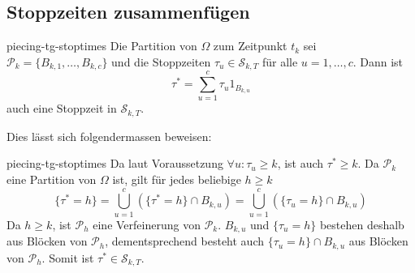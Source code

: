 \documentclass[11pt]{report} %
\begin{document}
\subsection{Stoppzeiten zusammenfügen}
\begin{Theorem}{}{piecing-tg-stoptimes}
    Die Partition von $\Omega$ zum Zeitpunkt $t_k$ sei $\mathcal{P}_k=\{B_{k, 1}, \ldots, B_{k, c}\}$ und die Stoppzeiten $\tau_u\in\mathcal{S}_{k, T}$ für alle $u=1, \ldots, c$. Dann ist $$\tau^*=\sum_{u=1}^{c}\tau_u1_{B_{k, u}}$$auch eine Stoppzeit in $\mathcal{S}_{k, T}$.
\end{Theorem}
Dies lässt sich folgendermassen beweisen:
\begin{Beweis}{}{piecing-tg-stoptimes}
    Da laut Voraussetzung $\forall u:\tau_u\geq k$, ist auch $\tau^*\geq k$. Da $\mathcal{P}_k$ eine Partition von $\Omega$ ist, gilt für jedes beliebige $h\geq k$ $$\{\tau^*=h\}=\bigcup_{u=1}^{c}(\{\tau^*=h\}\cap B_{k, u})=\bigcup_{u=1}^{c}(\{\tau_u=h\}\cap B_{k, u})$$ Da $h\geq k$, ist $\mathcal{P}_h$ eine Verfeinerung von $\mathcal{P}_k$. $B_{k, u}$ und $\{\tau_u=h\}$ bestehen deshalb aus Blöcken von $\mathcal{P}_h$, dementsprechend besteht auch $\{\tau_u=h\}\cap B_{k, u}$ aus Blöcken von $\mathcal{P}_h$. Somit ist $\tau^*\in \mathcal{S}_{k, T}. $
\end{Beweis}
\end{document}
